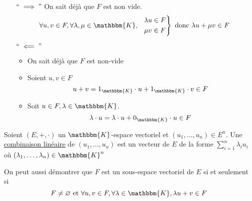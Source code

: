 \begin{prv}
	\begin{itemize}
		\item[$``\implies"$] On sait déjà que $F$ est non vide.
			\[
				\forall u,v \in F, \forall \lambda,\mu \in \mathbbm{K},
				~~
				\begin{rcases*}
					\lambda u \in F\\
					\mu v \in F
				\end{rcases*} \text{ donc } \lambda u + \mu v \in F
			\] 
		\item[$``\impliedby"$]
			\begin{itemize}
				\item On sait déjà que $F$ est non-vide
				\item Soient $u,v \in F$ \[
						u + v = 1_\mathbbm{K}\cdot u + 1_\mathbbm{K}\cdot v \in F
					\] 
				\item Soit $u \in F, \lambda \in \mathbbm{K}$. \[
					\lambda\cdot u = \lambda\cdot u + 0_\mathbbm{K} \cdot u \in F
				\] 
			\end{itemize}
	\end{itemize}
\end{prv}

\begin{defn}
	Soient $(E,+,\cdot)$ un $\mathbbm{K}$-espace vectoriel et $(u_1, \ldots, u_n) \in E^n$.
	Une \underline{combinaison linéaire} de $(u_1, \ldots, u_n)$ est un vecteur de $E$ de la forme $\sum_{i=1}^{n} \lambda_i u_i$ où $(\lambda_1, \ldots, \lambda_n) \in \mathbbm{K}^n$
\end{defn}

\begin{rmk}
	On peut aussi démontrer que $F$ est un sous-espace vectoriel de $E$ si et seulement si  \[
		F \neq  \O \text{ et } \forall u,v \in F, \forall \lambda \in \mathbbm{K}, \lambda u + v \in F
	\]
\end{rmk}

